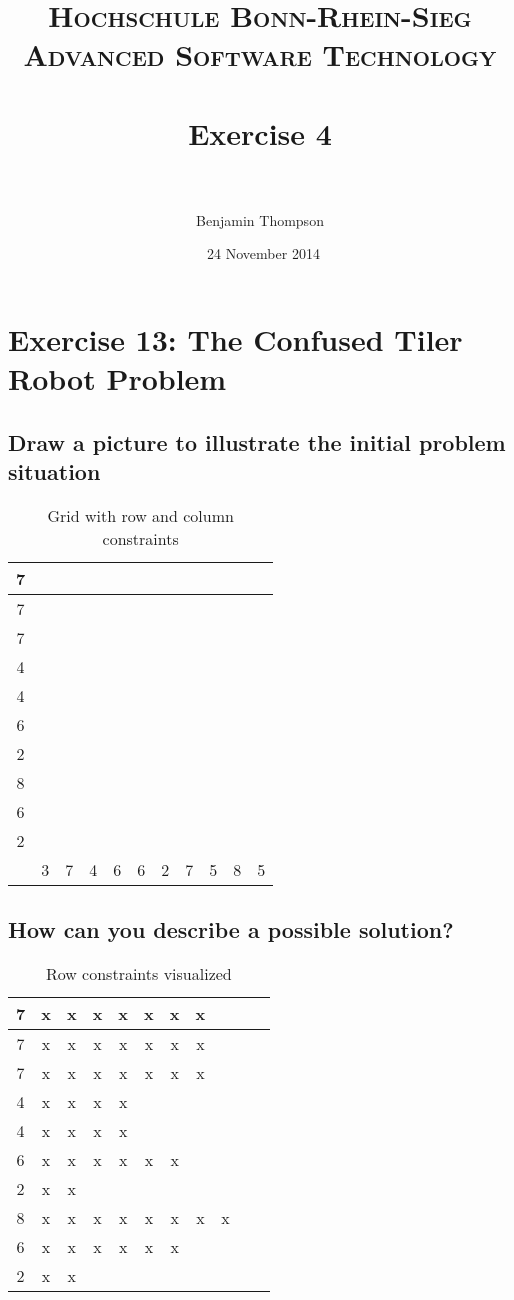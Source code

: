 \documentclass[paper=a4, fontsize=11pt]{scrartcl} %
\title{	
\normalfont \normalsize 
\textsc{Hochschule Bonn-Rhein-Sieg} \\ [10pt] %
\textsc{Advanced Software Technology} \\ [10pt]
\horrule{0.5pt} \\[0.4cm] %
\huge  Exercise 4 \\ %
\horrule{2pt} \\ %
}
\author{Benjamin Thompson} %
\date{\normalsize\ 24 November 2014} %
\numberwithin{figure}{section} %
\numberwithin{table}{section} %
\begin{document}
\maketitle %

\section{Exercise 13: The Confused Tiler Robot Problem}

\subsection{Draw a picture to illustrate the initial problem situation}
\begin{table}[!th]
\centering
\begin{tabular}{c||c|c|c|c|c|c|c|c|c|c|}
\hline
7 &&&&&&&&&& \\
\hline
7 &&&&&&&&&& \\
\hline
7 &&&&&&&&&& \\
\hline
4&&&&&&&&&& \\
\hline
4&&&&&&&&&& \\
\hline
6&&&&&&&&&&\\
\hline
2&&&&&&&&&&\\
\hline
8&&&&&&&&&&\\
\hline
6&&&&&&&&&&\\
\hline
2&&&&&&&&&&\\
\hline
\hline
&3&7&4&6&6&2&7&5&8&5
\end{tabular}
\caption{Grid with row and column constraints}
\label{ex:table}
\end{table}
\subsection{How can you describe a possible solution?}
\begin{table}[!th]
\centering
\begin{tabular}{c||c|c|c|c|c|c|c|c|c|c|}
\hline
7 & x & x & x & x & x & x & x &&& \\
\hline
7 & x & x & x & x & x & x & x &&& \\
\hline
7 & x & x & x & x & x & x & x &&& \\
\hline
4 & x & x & x & x &&&&&& \\
\hline
4 & x & x & x & x &&&&&& \\
\hline
6&x&x&x&x&x&x&&&&\\
\hline
2&x&x&&&&&&&&\\
\hline
8&x&x&x&x&x&x&x&x&&\\
\hline
6&x&x&x&x&x&x&&&&\\
\hline
2&x&x&&&&&&&&\\
\hline
\end{tabular}
\caption{Row constraints visualized}
\label{ex:table}
\end{table}
\end{document}
